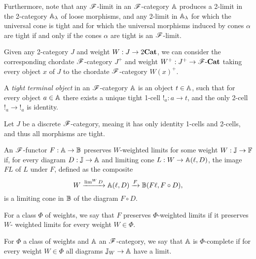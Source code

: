 \documentclass[../thesis.tex]{subfiles}
\begin{document}
Furthermore, note that any ${\mathscr{F}}$-limit in an ${\mathscr{F}}$-category ${\mathbb{A}}$ produces a 2-limit in the 2-category ${\mathbb{A}}_
\lambda$ of loose morphisms, and any 2-limit in ${\mathbb{A}}_\lambda$ for which the universal cone is tight and
for which the universal morphisms induced by cones $\alpha$ are tight if and only if the cones $\alpha$ are
tight is an ${\mathscr{F}}$-limit.

\begin{example}
  Given any 2-category $J$ and weight $W : J \to 2{\mathbf{Cat}}$, we can consider the corresponding
  chordate ${\mathscr{F}}$-category $J^+$ and weight $W^+ : J^+ \to {\mathscr{F}}\text-{\mathbf{Cat}}$ taking every object
  $x$ of $J$ to the chordate ${\mathscr{F}}$-category $W(x)^+$. 
\end{example}

\begin{example}
  A \emph{tight terminal object} in an ${\mathscr{F}}$-category ${\mathbb{A}}$ is an object $t \in {\mathbb{A}}$, such that for
  every object $a \in {\mathbb{A}}$ there exists a unique tight 1-cell $!_a : a \to t$, and the only 2-cell
  $!_a \to\mathop{!}_a$ is identity. 
\end{example}


\begin{example}
  Let $J$ be a discrete ${\mathscr{F}}$-category, meaing it has only identity 1-cells and 2-cells, and thus all
  morphisms are tight.
\end{example}

\begin{definition}
  An ${\mathscr{F}}$-functor $F : {\mathbb{A}} \to {\mathbb{B}}$ preserves $W$-weighted limits for some weight $W : {\mathbb{J}} \to {\mathbb{F}}$ if,
  for every diagram $D : {\mathbb{J}} \to {\mathbb{A}}$ and limiting cone $L : W \to {\mathbb{A}}(\ell, D)$, the image $F L$ of $L$
  under $F$, defined as the composite
  \[W \xrightarrow{\lim^W D} {\mathbb{A}}(\ell, D) \xrightarrow{F} {\mathbb{B}}(F\ell, F \circ D),\]
  is a limiting cone in ${\mathbb{B}}$ of the diagram $F \circ D$.

  For a class $\Phi$ of weights, we say that $F$ preserves $\Phi$-weighted limits if it preserves $W$-%
  weighted limits for every weight $W \in \Phi$.
\end{definition}

\begin{definition}[Completeness]
  For $\Phi$ a class of weights and ${\mathbb{A}}$ an ${\mathscr{F}}$-category, we say that ${\mathbb{A}}$ is $\Phi$-complete if for
  every weight $W \in \Phi$ all diagrams ${\mathbb{J}}_W \to {\mathbb{A}}$ have a limit.
\end{definition}
\end{document}
